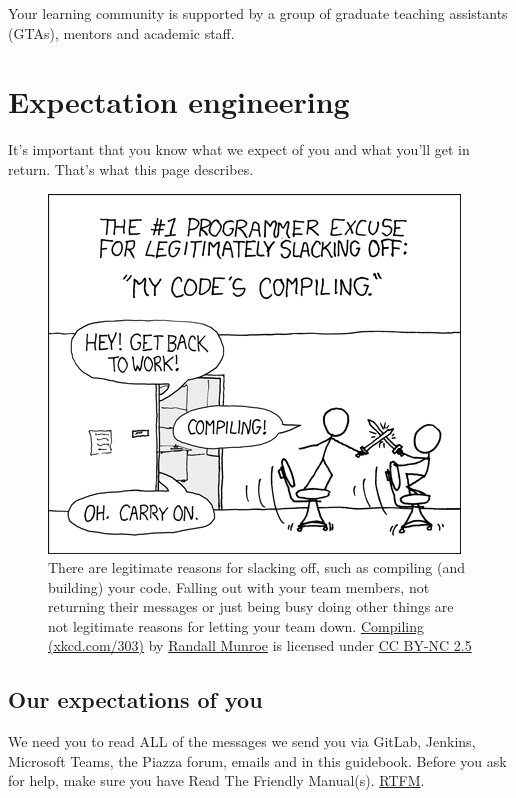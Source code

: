 \documentclass[
]{book}
\begin{document}
Your learning community is supported by a group of graduate teaching assistants (GTAs), mentors and academic staff.

\hypertarget{agile}{%
\section{Expectation engineering}\label{agile}}

It's important that you know what we expect of you and what you'll get in return. That's what this page describes.

\begin{figure}

{\centering \includegraphics[width=0.75\linewidth]{images/compiling} 

}

\caption{There are legitimate reasons for slacking off, such as compiling (and building) your code. Falling out with your team members, not returning their messages or just being busy doing other things are not legitimate reasons for letting your team down. \href{https://xkcd.com/303/}{Compiling (xkcd.com/303)} by \href{https://en.wikipedia.org/wiki/Randall_Munroe}{Randall Munroe} is licensed under \href{https://creativecommons.org/licenses/by-nc/2.5/}{CC BY-NC 2.5}}\label{fig:xkcd-compiling-fig}
\end{figure}



\hypertarget{rtfm}{%
\subsection{Our expectations of you}\label{rtfm}}

We need you to read ALL of the messages we send you via GitLab, Jenkins, Microsoft Teams, the Piazza forum, emails and in this guidebook. Before you ask for help, make sure you have Read The Friendly Manual(s). \href{https://en.wikipedia.org/wiki/RTFM}{RTFM}.
\end{document}
